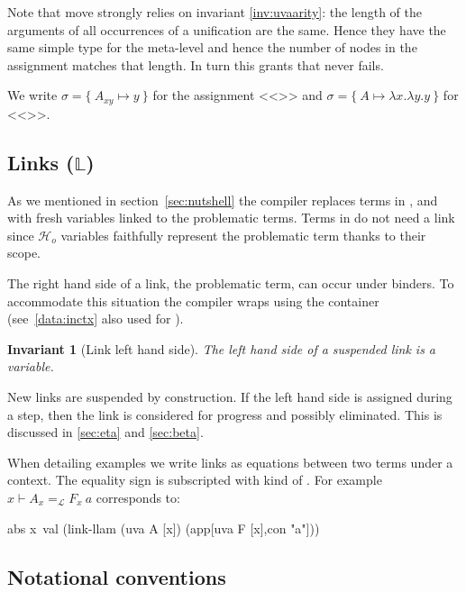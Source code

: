\documentclass[sigconf,natbib=false,review]{acmart}
\newtheorem{invariant}{Invariant}
\newcommand{\llambda}{\ensuremath{\mathcal{L}}\xspace}
\newcommand{\Ho}{\texorpdfstring{\ensuremath{\mathcal{H}_o}\xspace}{Ho}}
\newcommand{\linkbetaM}[3]{\ensuremath{#1 \vdash #2 =_{\llambda} #3}}
\newcommand{\linkStore}{\texorpdfstring{\ensuremath{\mathbb{L}}\xspace}{L}}
\begin{document}


\noindent
Note that move strongly relies on invariant \ref{inv:uvaarity}: the length
of the arguments of all occurrences of a unification are the same. Hence
they have the same simple type for the meta-level and hence the number of
 nodes in the assignment matches that length.
In turn this grants that  never fails.



We write $\sigma = \{~ A_{xy} \mapsto y ~\}$ for the assignment
<<>> and $\sigma = \{~ A \mapsto \lambda x.\lambda y.y ~\}$
for <<>>.

\subsection{Links (\linkStore)}

\noindent
As we mentioned in section~\ref{sec:nutshell} the compiler
replaces terms in \maybeeta, \maybebeta and \notllambda with fresh
variables linked to the problematic terms. Terms in \maybebeta do not
need a link since \Ho{} variables faithfully represent
the problematic term thanks to their scope.



\noindent
The right hand side of a link, the problematic term, can occur under binders.
To accommodate this situation the compiler wraps  using
the  container (see~\ref{data:inctx} also used for ).

\begin{invariant}[Link left hand side]\label{inv:linklhs}
  The left hand side of a suspended link
  is a variable.
\end{invariant}

\noindent
New links are suspended by construction.
If the left hand side is assigned during a step, then 
the link is considered for progress and possibly eliminated.
This is discussed in \cref{sec:eta} and \cref{sec:beta}.

When detailing examples we write links as equations between two
terms under a context.
The equality sign is subscripted with
kind of . For example $\linkbetaM{x}{A_x}{F_x~a}$ corresponds to:
\begin{elpicode}
abs x\ val (link-llam (uva A [x]) (app[uva F [x],con "a"]))
\end{elpicode}

\subsection{Notational conventions}
\end{document}
